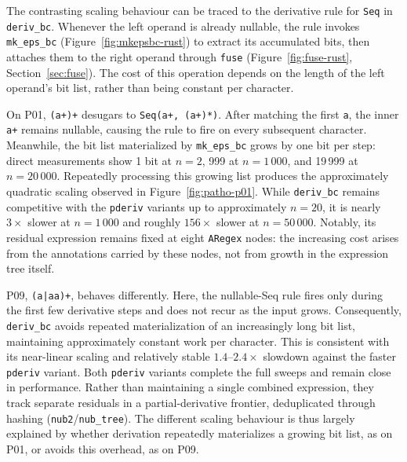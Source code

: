 The contrasting scaling behaviour can be traced
to the derivative rule for \texttt{Seq} in
\texttt{deriv\_bc}.
Whenever the left operand is already nullable,
the rule invokes \texttt{mk\_eps\_bc}
(Figure~\ref{fig:mkepsbc-rust}) to extract its
accumulated bits, then attaches them to the
right operand through \texttt{fuse}
(Figure~\ref{fig:fuse-rust},
Section~\ref{sec:fuse}).
The cost of this operation depends on the
length of the left operand's bit list,
rather than being constant per character.

On P01, \texttt{(a+)+} desugars to
\texttt{Seq(a+, (a+)*)}.
After matching the first \texttt{a},
the inner \texttt{a+} remains nullable,
causing the rule to fire on every subsequent
character.
Meanwhile, the bit list materialized by
\texttt{mk\_eps\_bc} grows by one bit per step:
direct measurements show 1 bit at $n=2$,
999 at $n=1\,000$, and 19\,999 at $n=20\,000$.
Repeatedly processing this growing list
produces the approximately quadratic scaling
observed in Figure~\ref{fig:patho-p01}.
While \texttt{deriv\_bc} remains competitive
with the \texttt{pderiv} variants up to
approximately $n=20$, it is nearly
$3\times$ slower at $n=1\,000$ and
roughly $156\times$ slower at $n=50\,000$.
Notably, its residual expression remains
fixed at eight \texttt{ARegex} nodes:
the increasing cost arises from the
annotations carried by these nodes,
not from growth in the expression tree itself.

P09, \texttt{(a|aa)+}, behaves differently.
Here, the nullable-Seq rule fires only
during the first few derivative steps
and does not recur as the input grows.
Consequently, \texttt{deriv\_bc} avoids
repeated materialization of an increasingly
long bit list, maintaining approximately
constant work per character.
This is consistent with its near-linear
scaling and relatively stable
$1.4$--$2.4\times$ slowdown against
the faster \texttt{pderiv} variant.
Both \texttt{pderiv} variants complete
the full sweeps and remain close in performance.
Rather than maintaining a single combined
expression, they track separate residuals
in a partial-derivative frontier,
deduplicated through hashing
(\texttt{nub2}/\texttt{nub\_tree}).
The different scaling behaviour is thus
largely explained by whether derivation
repeatedly materializes a growing bit list,
as on P01, or avoids this overhead, as on P09.


%
%
%

\clearpage
